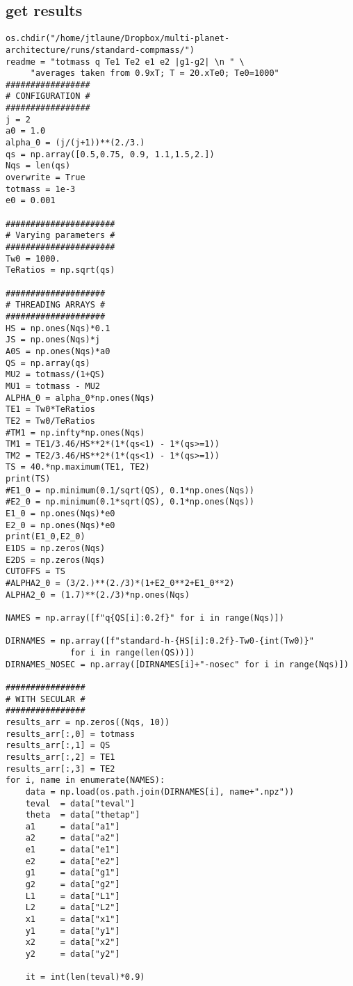 \documentclass[11pt]{article}
\begin{document}
\subsection{get results}
\label{sec:orgc5ef82f}
\begin{verbatim}
os.chdir("/home/jtlaune/Dropbox/multi-planet-architecture/runs/standard-compmass/")
readme = "totmass q Te1 Te2 e1 e2 |g1-g2| \n " \
	 "averages taken from 0.9xT; T = 20.xTe0; Te0=1000"
#################
# CONFIGURATION #
#################
j = 2
a0 = 1.0
alpha_0 = (j/(j+1))**(2./3.)
qs = np.array([0.5,0.75, 0.9, 1.1,1.5,2.])
Nqs = len(qs)
overwrite = True
totmass = 1e-3
e0 = 0.001

######################
# Varying parameters #
######################
Tw0 = 1000.
TeRatios = np.sqrt(qs)

####################
# THREADING ARRAYS #
####################
HS = np.ones(Nqs)*0.1
JS = np.ones(Nqs)*j
A0S = np.ones(Nqs)*a0
QS = np.array(qs)
MU2 = totmass/(1+QS)
MU1 = totmass - MU2
ALPHA_0 = alpha_0*np.ones(Nqs)
TE1 = Tw0*TeRatios
TE2 = Tw0/TeRatios
#TM1 = np.infty*np.ones(Nqs)
TM1 = TE1/3.46/HS**2*(1*(qs<1) - 1*(qs>=1))
TM2 = TE2/3.46/HS**2*(1*(qs<1) - 1*(qs>=1))
TS = 40.*np.maximum(TE1, TE2)
print(TS)
#E1_0 = np.minimum(0.1/sqrt(QS), 0.1*np.ones(Nqs))
#E2_0 = np.minimum(0.1*sqrt(QS), 0.1*np.ones(Nqs))
E1_0 = np.ones(Nqs)*e0
E2_0 = np.ones(Nqs)*e0
print(E1_0,E2_0)
E1DS = np.zeros(Nqs)
E2DS = np.zeros(Nqs)
CUTOFFS = TS
#ALPHA2_0 = (3/2.)**(2./3)*(1+E2_0**2+E1_0**2)
ALPHA2_0 = (1.7)**(2./3)*np.ones(Nqs)

NAMES = np.array([f"q{QS[i]:0.2f}" for i in range(Nqs)])

DIRNAMES = np.array([f"standard-h-{HS[i]:0.2f}-Tw0-{int(Tw0)}"
		     for i in range(len(QS))])
DIRNAMES_NOSEC = np.array([DIRNAMES[i]+"-nosec" for i in range(Nqs)])

################
# WITH SECULAR #
################
results_arr = np.zeros((Nqs, 10))
results_arr[:,0] = totmass
results_arr[:,1] = QS
results_arr[:,2] = TE1
results_arr[:,3] = TE2
for i, name in enumerate(NAMES):
    data = np.load(os.path.join(DIRNAMES[i], name+".npz"))
    teval  = data["teval"]
    theta  = data["thetap"]
    a1     = data["a1"]
    a2     = data["a2"]
    e1     = data["e1"]
    e2     = data["e2"]
    g1     = data["g1"]
    g2     = data["g2"]
    L1     = data["L1"]
    L2     = data["L2"]
    x1     = data["x1"]
    y1     = data["y1"]
    x2     = data["x2"]
    y2     = data["y2"]

    it = int(len(teval)*0.9)


\end{verbatim}
\end{document}
